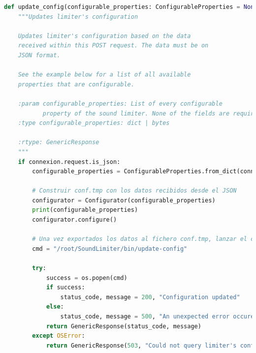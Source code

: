 \begin{lstlisting}[language=python, caption={\glsname{API-REST} del LM11}, label={lst:lms11-api-conf}]
def update_config(configurable_properties: ConfigurableProperties = None):
    """Updates limiter's configuration

    Updates limiter's configuration based on the data
    received within this POST request. The data must be on
    JSON format.

    See the example below for a list of all available
    properties that are configurable.

    :param configurable_properties: List of every configurable
           property of the sound limiter. None of the fields are required.
    :type configurable_properties: dict | bytes

    :rtype: GenericResponse
    """
    if connexion.request.is_json:
        configurable_properties = ConfigurableProperties.from_dict(connexion.request.get_json())

        # Construir conf.tmp con los datos recibidos desde el JSON
        configurator = Configurator(configurable_properties)
        print(configurable_properties)
        configurator.configure()

        # Una vez exportados los datos al fichero conf.tmp, lanzar el configurador.
        cmd = "/root/SoundLimiter/bin/update-config"

        try:
            success = os.popen(cmd)
            if success:
                status_code, message = 200, "Configuration updated"
            else:
                status_code, message = 500, "An unexpected error occured during the configuration"
            return GenericResponse(status_code, message)
        except OSError:
            return GenericResponse(503, "Could not query limiter's configurator service")
\end{lstlisting}

%
